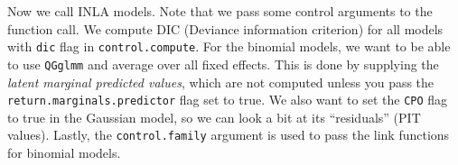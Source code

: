 \begin{Shaded}
\begin{Highlighting}[]
                   \NormalTok{(}\NormalTok{, }\NormalTok{))}
\NormalTok{    ) }
\NormalTok{  )}
\OtherTok{\textless{}{-}} \NormalTok{(}
    \SpecialCharTok{\textasciitilde{}}\SpecialCharTok{+} 
       \NormalTok{, } \NormalTok{,}
       \NormalTok{(} \NormalTok{(}
         \NormalTok{(}\NormalTok{),}
         
\NormalTok{      ))}
\NormalTok{    )}
\NormalTok{  )}
\NormalTok{\}}
\end{Highlighting}
\end{Shaded}

Now we call INLA models. Note that we pass some control arguments to the
function call. We compute DIC (Deviance information criterion) for all
models with \texttt{dic} flag in \texttt{control.compute}. For the
binomial models, we want to be able to use \texttt{QGglmm} and average
over all fixed effects. This is done by supplying the \emph{latent
marginal predicted values}, which are not computed unless you pass the
\texttt{return.marginals.predictor} flag set to true. We also want to
set the \texttt{CPO} flag to true in the Gaussian model, so we can look
a bit at its ``residuals'' (PIT values). Lastly, the
\texttt{control.family} argument is used to pass the link functions for
binomial models.

